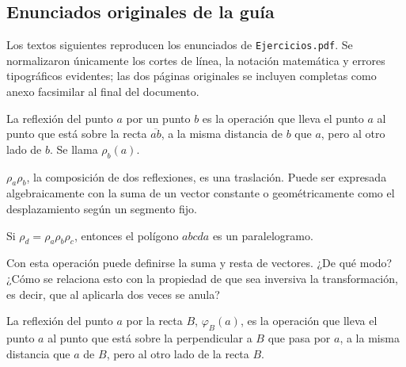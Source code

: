 {\small\vspace{1mm}\par}

\subsection{Enunciados originales de la guía}

Los textos siguientes reproducen los enunciados de \texttt{Ejercicios.pdf}. Se normalizaron
únicamente los cortes de línea, la notación matemática y errores tipográficos evidentes; las
dos páginas originales se incluyen completas como anexo facsimilar al final del documento.

\begin{enunciado}[Definición 1]
La reflexión del punto \(a\) por un punto \(b\) es la operación que lleva el punto \(a\) al
punto que está sobre la recta \(\overline{ab}\), a la misma distancia de \(b\) que \(a\),
pero al otro lado de \(b\). Se llama \(\rho_b(a)\).
\end{enunciado}

\begin{enunciado}[Teorema 1]
\(\rho_a\rho_b\), la composición de dos reflexiones, es una traslación. Puede ser expresada
algebraicamente con la suma de un vector constante o geométricamente como el desplazamiento
según un segmento fijo.
\end{enunciado}

\begin{enunciado}[Teorema 2]
Si \(\rho_d=\rho_a\rho_b\rho_c\), entonces el polígono \(abcda\) es un paralelogramo.
\end{enunciado}

\begin{enunciado}[Observación]
Con esta operación puede definirse la suma y resta de vectores. ¿De qué modo? ¿Cómo se
relaciona esto con la propiedad de que sea inversiva la transformación, es decir, que al
aplicarla dos veces se anula?
\end{enunciado}

\begin{enunciado}[Definición 2]
La reflexión del punto \(a\) por la recta \(B\), \(\varphi_B(a)\), es la operación que lleva
el punto \(a\) al punto que está sobre la perpendicular a \(B\) que pasa por \(a\), a la misma
distancia que \(a\) de \(B\), pero al otro lado de la recta \(B\).
\end{enunciado}


